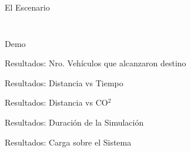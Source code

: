 \documentclass[aspectratio=169]{beamer}
\begin{document}
\begin{frame}{El Escenario}
\begin{columns}
\begin{column}{.5\linewidth}
\begin{figure}[p]
        \end{figure}
    \end{column}
\end{columns}
\end{frame}

\begin{frame}[standout]
\centering
Demo
\end{frame}

\begin{frame}{Resultados: Nro. Vehículos que alcanzaron destino}
\begin{figure}
    \centering
    \renewcommand{\figurewidth}{\linewidth}
    \renewcommand{\figureheight}{200}
    
\end{figure}
\end{frame}

\begin{frame}{Resultados: Distancia vs Tiempo}
\begin{figure}
    \centering
    \renewcommand{\figurewidth}{\linewidth}
    \renewcommand{\figureheight}{165}
    
\end{figure}
\end{frame}

\begin{frame}{Resultados: Distancia vs CO$^2$}
\begin{figure}
    \centering
    \renewcommand{\figurewidth}{\linewidth}
    \renewcommand{\figureheight}{165}
    
\end{figure}
\end{frame}

\begin{frame}{Resultados: Duración de la Simulación}
\begin{figure}
    \centering
    \renewcommand{\figurewidth}{\linewidth}
    \renewcommand{\figureheight}{165}
    
\end{figure}
\end{frame}

\begin{frame}{Resultados: Carga sobre el Sistema}
\begin{figure}
    \centering
    \renewcommand{\figurewidth}{\linewidth}
    \renewcommand{\figureheight}{180}
    
\end{figure}
\end{frame}
\end{document}
